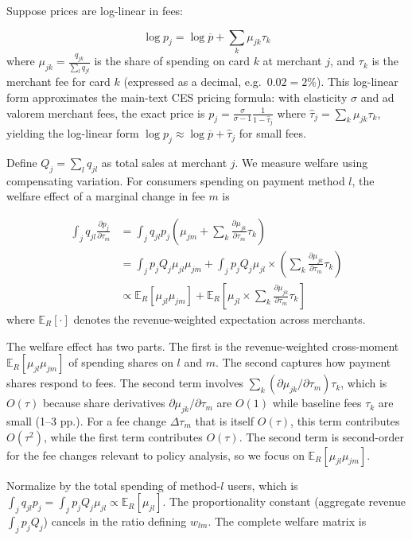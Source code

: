 \documentclass[main.tex]{subfiles}
\begin{document}
Suppose prices are log-linear in fees:

\[
\log p_{j}=\log\overline{p}+\sum_{k}\mu_{jk}\tau_{k}
\]
where $\mu_{jk}=\frac{q_{jk}}{\sum_{l}q_{jl}}$ is the share of spending on card $k$ at merchant $j$, and $\tau_{k}$ is the merchant fee for card $k$ (expressed as a decimal, e.g.\ $0.02 = 2\%$).
This log-linear form approximates the main-text CES pricing formula: with elasticity $\sigma$ and ad valorem merchant fees, the exact price is $p_j = \frac{\sigma}{\sigma-1}\frac{1}{1-\hat{\tau}_j}$ where $\hat{\tau}_j = \sum_k \mu_{jk}\tau_k$, yielding the log-linear form $\log p_j \approx \log\overline{p} + \hat{\tau}_j$ for small fees.

Define $Q_{j}=\sum_{l}q_{jl}$ as total sales at merchant $j$.
We measure welfare using compensating variation.
For consumers spending on payment method $l$, the welfare effect of a marginal change in fee $m$ is

\begin{align*}
\int_{j}q_{jl}\frac{\partial p_{j}}{\partial\tau_{m}} & =\int_{j}q_{jl}p_{j}\left(\mu_{jm}+\sum_{k}\frac{\partial\mu_{jk}}{\partial\tau_{m}}\tau_{k}\right)\\
 & =\int_{j}p_{j}Q_{j}\mu_{jl}\mu_{jm}+\int_{j}p_{j}Q_{j}\mu_{jl}\times\left(\sum_{k}\frac{\partial\mu_{jk}}{\partial\tau_{m}}\tau_{k}\right)\\
 & \propto\mathbb{E}_{R}\left[\mu_{jl}\mu_{jm}\right]+\mathbb{E}_{R}\left[\mu_{jl}\times\sum_{k}\frac{\partial\mu_{jk}}{\partial\tau_{m}}\tau_{k}\right]
\end{align*}
where $\mathbb{E}_R[\cdot]$ denotes the revenue-weighted expectation across merchants.

The welfare effect has two parts. The first is the revenue-weighted cross-moment $\mathbb{E}_{R}[\mu_{jl}\mu_{jm}]$ of spending shares on $l$ and $m$. The second captures how payment shares respond to fees.
The second term involves $\sum_k (\partial\mu_{jk}/\partial\tau_m) \tau_k$, which is $O(\tau)$ because share derivatives $\partial\mu_{jk}/\partial\tau_m$ are $O(1)$ while baseline fees $\tau_k$ are small (1--3 pp.).
For a fee change $\Delta\tau_m$ that is itself $O(\tau)$, this term contributes $O(\tau^2)$, while the first term contributes $O(\tau)$.
The second term is second-order for the fee changes relevant to policy analysis, so we focus on $\mathbb{E}_{R}\left[\mu_{jl}\mu_{jm}\right]$.

Normalize by the total spending of method-$l$ users, which is $\int_{j}q_{jl}p_{j}=\int_{j}p_{j}Q_{j}\mu_{jl}\propto\mathbb{E}_{R}\left[\mu_{jl}\right]$.
The proportionality constant (aggregate revenue $\int_j p_j Q_j$) cancels in the ratio defining $w_{lm}$.
The complete welfare matrix is
\end{document}
